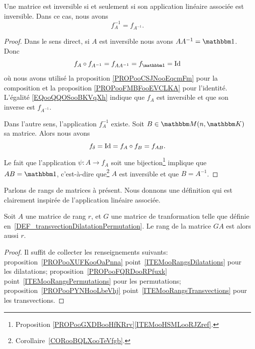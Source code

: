\begin{proposition}     \label{PROPooNPMCooPmaCwu}
    Une matrice est inversible si et seulement si son application linéaire associée est inversible. Dans ce cas, nous avons
    \begin{equation}
        f_A^{-1}=f_{A^{-1}}.
    \end{equation}
\end{proposition}

\begin{proof}
    Dans le sens direct, si \( A\) est inversible nous avons \( AA^{-1}=\mtu\). Donc
    \begin{equation}        \label{EQooQQOSooBKVqXh}
        f_A\circ f_{A^{-1}}=f_{AA^{-1}}=f_{\mtu}=\id
    \end{equation}
    où nous avons utilisé la proposition \ref{PROPooCSJNooEqcmFm} pour la composition et la proposition \ref{PROPooFMBFooEVCLKA} pour l'identité. L'égalité \eqref{EQooQQOSooBKVqXh} indique que \( f_A\) est inversible et que son inverse est \( f_{A^{-1}}\).

    Dans l'autre sens, l'application \( f_A^{-1}\) existe. Soit \( B\in \eM(n,\eK)\) sa matrice. Alors nous avons
    \begin{equation}
        f_{\delta}=\operatorname{Id}=f_A\circ f_B=f_{AB}.
    \end{equation}
    Le fait que l'application \(\psi\colon A\to f_A\) soit une bijection\footnote{Proposition \ref{PROPooGXDBooHfKRrv}\ref{ITEMooHSMLooRJZref}.} implique que \( AB=\mtu\), c'est-à-dire que\footnote{Corollaire~\ref{CORooBQLXooTeVfgb}.} \( A\) est inversible et que \( B=A^{-1}\).
\end{proof}


Parlons de rangs de matrices à présent. Nous donnons une définition qui est clairement inspirée de l'application linéaire associée.
\begin{lemma}
  Soit \( A \) une matrice de rang \( r \), et \( G \) une matrice de tranformation telle que définie en~\ref{DEF_transvectionDilatationPermutation}. Le rang de la matrice \( GA \) est alors aussi \( r \).
\end{lemma}

\begin{proof}
Il suffit de collecter les renseignements suivants: proposition~\ref{PROPooXUFKooOaPnna} point~\ref{ITEMooRangsDilatations} pour les dilatations; proposition~\ref{PROPooFQRDooRPfuxk} point~\ref{ITEMooRangsPermutations} pour les permutations; proposition~\ref{PROPooPYNHooLbeVhj} point~\ref{ITEMooRangsTransvections} pour les transvections.
\end{proof}

